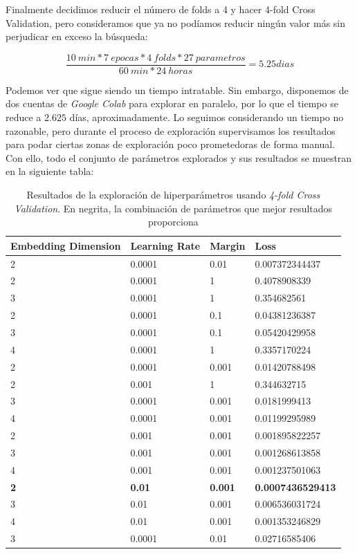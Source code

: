 \documentclass[11pt]{article}
\begin{document}
Finalmente decidimos reducir el número de folds a 4 y hacer 4-fold Cross Validation, pero consideramos que ya no podíamos reducir ningún valor más sin perjudicar en exceso la búsqueda:

$$\frac{10 \:  min * 7 \: epocas * 4 \: folds * 27 \: parametros}{60 \: min * 24 \: horas} = 5.25 dias$$

Podemos ver que sigue siendo un tiempo intratable. Sin embargo, disponemos de dos cuentas de \emph{Google Colab} para explorar en paralelo, por lo que el tiempo se reduce a $2.625$ días, aproximadamente. Lo seguimos considerando un tiempo no razonable, pero durante el proceso de exploración supervisamos los resultados para podar ciertas zonas de exploración poco prometedoras de forma manual. Con ello, todo el conjunto de parámetros explorados y sus resultados se muestran en la siguiente tabla:

\begin{table}[H]
    \centering
    \begin{tabular}{|l|l|l|l|}
    \hline
        Embedding Dimension & Learning Rate & Margin & Loss \\ \hline
        2 & 0.0001 & 0.01 & 0.007372344437 \\ 
        2 & 0.0001 & 1 & 0.4078908339 \\ 
        3 & 0.0001 & 1 & 0.354682561 \\ 
        2 & 0.0001 & 0.1 & 0.04381236387 \\ 
        3 & 0.0001 & 0.1 & 0.05420429958 \\ 
        4 & 0.0001 & 1 & 0.3357170224 \\ 
        2 & 0.0001 & 0.001 & 0.01420788498 \\ 
        2 & 0.001 & 1 & 0.344632715 \\ 
        3 & 0.0001 & 0.001 & 0.0181999413 \\ 
        4 & 0.0001 & 0.001 & 0.01199295989 \\ 
        2 & 0.001 & 0.001 & 0.001895822257 \\ 
        3 & 0.001 & 0.001 & 0.001268613858 \\ 
        4 & 0.001 & 0.001 & 0.001237501063 \\ 
        \textbf{2} & \textbf{0.01} & \textbf{0.001} & \textbf{0.0007436529413} \\ 
        3 & 0.01 & 0.001 & 0.006536031724 \\ 
        4 & 0.01 & 0.001 & 0.001353246829 \\ 
        3 & 0.0001 & 0.01 & 0.02716585406 \\ 
      \hline
    \end{tabular}
    \caption{Resultados de la exploración de hiperparámetros usando \emph{4-fold Cross Validation}. En negrita, la combinación de parámetros que mejor resultados proporciona}
\end{table}
\end{document}
